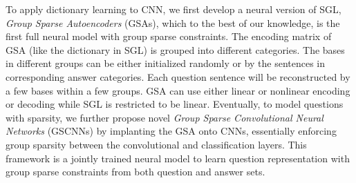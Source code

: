 To apply dictionary learning to CNN,
we first develop a neural version of SGL, {\em Group Sparse Autoencoders} (GSAs),
which to the best of our knowledge, is the first full neural model with group sparse constraints.
The encoding matrix of GSA (like the dictionary in SGL) is grouped into different categories. 
The bases in different groups can be either initialized randomly or by the sentences in corresponding answer categories. 
Each question sentence will be reconstructed by a few bases within a few groups. 
GSA can use either linear or nonlinear encoding or decoding while SGL is restricted to be linear.
Eventually, %
to model questions with sparsity,
we further propose novel {\em Group Sparse Convolutional Neural Networks} (GSCNNs) by implanting the GSA onto CNNs, 
essentially enforcing group sparsity between the convolutional and classification layers. 
This framework is a jointly trained %
neural model to learn question representation with group sparse constraints from both question and answer sets. 







